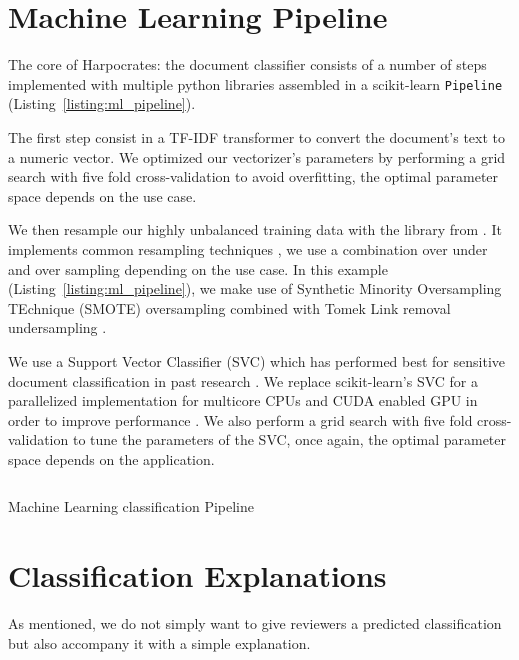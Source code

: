 \documentclass[\version]{l4proj}
\begin{document}
\section{Machine Learning Pipeline}

The core of Harpocrates: the document classifier consists of a number of steps implemented with multiple python libraries assembled in a scikit-learn \verb|Pipeline| (Listing~\ref{listing:ml_pipeline}).

The first step consist in a TF-IDF transformer to convert the document's text to a numeric vector.
We optimized our vectorizer's parameters by performing a grid search with five fold cross-validation to avoid overfitting, the optimal parameter space depends on the use case.

We then resample our highly unbalanced training data with the \textcite{ScikitlearncontribImbalancedlearn2020} library from \textcite{lemaitreImbalancedlearnPythonToolbox2017}.
It implements common resampling techniques \autocite{lemaitreImbalancedlearnPythonToolbox2017}, we use a combination over under and over sampling depending on the use case.
In this example (Listing~\ref{listing:ml_pipeline}), we make use of Synthetic Minority Oversampling TEchnique (SMOTE) oversampling combined with Tomek Link removal undersampling \autocite{batistaStudyBehaviorSeveral2004}.

We use a Support Vector Classifier (SVC) which has performed best for sensitive document classification in past research \autocite{mcdonaldClassifierDigitalSensitivity2014,mcdonaldStudySVMKernel2017}.
We replace scikit-learn's SVC for a parallelized implementation for multicore CPUs and CUDA enabled GPU in order to improve performance \autocite{wenThunderSVMFastSVM2018}.
We also perform a grid search with five fold cross-validation to tune the parameters of the SVC, once again, the optimal parameter space depends on the application.

\begin{listing}[H]
    \inputminted{python}{code/ml_pipeline.py}
    \caption{Machine Learning classification Pipeline}\label{listing:ml_pipeline}
\end{listing}

\section{Classification Explanations}

As mentioned, we do not simply want to give reviewers a predicted classification but also accompany it with a simple explanation.
\end{document}
